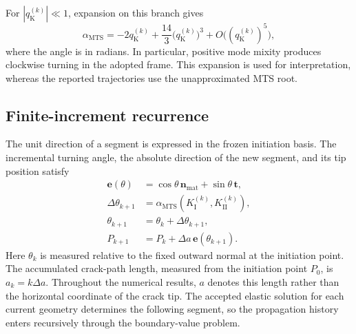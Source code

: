 \documentclass[11pt]{article}
\begin{document}
For $|q_{\mathrm{K}}^{(k)}|\ll1$, expansion on this branch gives
\begin{equation}
 \alpha_{\mathrm{MTS}}
 =-2q_{\mathrm{K}}^{(k)}
  +\frac{14}{3}\bigl(q_{\mathrm{K}}^{(k)}\bigr)^3
  +O\bigl((q_{\mathrm{K}}^{(k)})^5\bigr),
 \label{eq:mts-small-mixity}
\end{equation}
where the angle is in radians. In particular, positive mode mixity
produces clockwise turning in the adopted frame. This expansion is
used for interpretation, whereas the reported trajectories use the
unapproximated MTS root.

\subsection{Finite-increment recurrence}
The unit direction of a segment is expressed in the frozen initiation
basis. The incremental turning angle, the absolute direction of the new
segment, and its tip position satisfy
\begin{align}
 \bm e(\theta)&=\cos\theta\,\bm n_{\mathrm{mat}}
                 +\sin\theta\,\bm t,\label{eq:direction}\\
 \Delta\theta_{k+1}
   &=\alpha_{\mathrm{MTS}}(K_{\mathrm{I}}^{(k)},K_{\mathrm{II}}^{(k)}),
     \label{eq:turn}\\
 \theta_{k+1}&=\theta_k+\Delta\theta_{k+1},\label{eq:angleupdate}\\
 P_{k+1}&=P_k+\Delta a\,\bm e(\theta_{k+1}).\label{eq:pointupdate}
\end{align}
Here $\theta_k$ is measured relative to the fixed outward normal at
the initiation point. The accumulated crack-path length, measured from the initiation
point $P_0$, is $a_k=k\Delta a$. Throughout the numerical results,
$a$ denotes this length rather than the horizontal coordinate of the crack tip. The accepted
elastic solution for each current geometry determines the following
segment, so the propagation history enters recursively through the
boundary-value problem.
\end{document}
